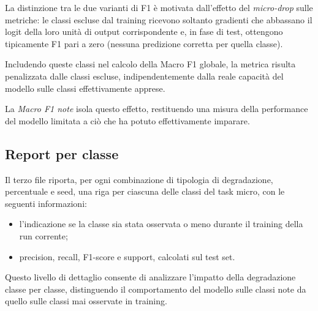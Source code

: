 La distinzione tra le due varianti di F1 è motivata dall'effetto del \emph{micro-drop} sulle metriche: le classi escluse dal training ricevono soltanto gradienti che abbassano il logit della loro unità di output corrispondente e, 
in fase di test, ottengono tipicamente F1 pari a zero (nessuna predizione corretta per quella classe). 

Includendo queste classi nel calcolo della Macro F1 globale, la metrica risulta penalizzata dalle classi escluse, 
indipendentemente dalla reale capacità del modello sulle classi effettivamente apprese.
 
La \emph{Macro F1 note} isola questo effetto, restituendo una misura della performance del modello limitata a ciò che ha potuto effettivamente imparare.

\subsection*{Report per classe}

Il terzo file riporta, per ogni combinazione di tipologia di degradazione, percentuale e seed, una riga per ciascuna delle classi del task micro, con le seguenti informazioni:

\begin{itemize}
    \item l'indicazione se la classe sia stata osservata o meno durante il training della run corrente;
    \item precision, recall, F1-score e support, calcolati sul test set.
\end{itemize}

Questo livello di dettaglio consente di analizzare l'impatto della degradazione classe per classe, distinguendo il comportamento del modello sulle classi note da quello sulle classi mai osservate in training.